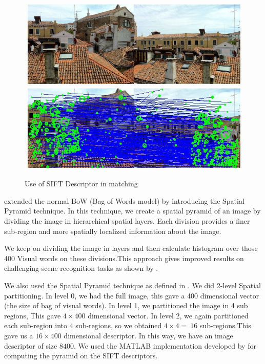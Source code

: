 
 \begin{center}
\begin{figure}
\centering
\includegraphics[width=\linewidth]{./Pictures/SIFT/siftMatching.jpg}
\includegraphics[width=\linewidth]{./Pictures/SIFT/siftMatchingDescriptor.jpg}
\caption{Use of SIFT Descriptor in matching }
\label{fig:siftMatching}
\end{figure}
\end{center}
 extended the normal BoW (Bag of Words model) by introducing the Spatial Pyramid technique. In this technique, we create a spatial pyramid of an image by dividing the image in hierarchical spatial layers. Each division provides a finer sub-region and more spatially localized information about the image. 

We keep on dividing the image in layers and then calculate histogram over those 400 Visual words on these divisions.This approach gives improved results on challenging scene recognition tasks as shown by  \citet*{bagOfWords}. 

We also used the Spatial Pyramid technique as defined in \citet*{bagOfWords}. We did 2-level Spatial partitioning. In level 0, we had the full image, this gave a 400 dimensional vector (the size of bag of visual words). In level 1, we partitioned the image in 4 sub regions, This gave $4 \times 400$ dimensional vector. In level 2, we again partitioned each sub-region into 4 sub-regions, so we obtained $4 \times 4 =\  16 $ sub-regions.This gave us a $16 \times 400 $ dimensional descriptor. In this way, we have an image descriptor of size $8400$. We used the MATLAB implementation developed by \citet*{bagOfWords} for computing the pyramid on the SIFT descriptors.

